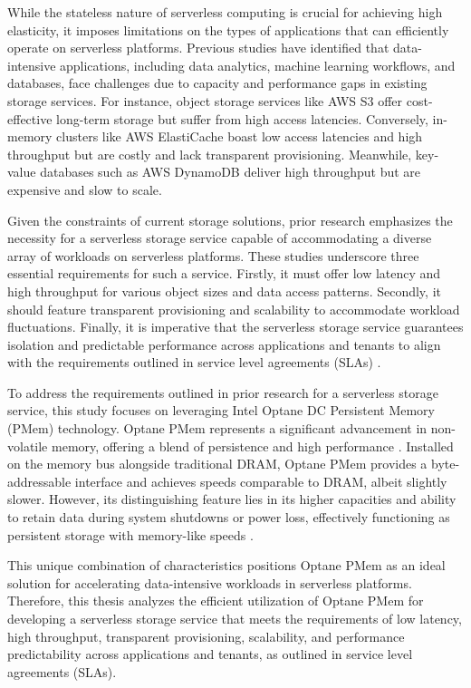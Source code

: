 While the stateless nature of serverless computing is crucial for achieving high elasticity, it imposes limitations on the types of applications that can efficiently operate on serverless platforms. Previous studies \cite{jonas2019cloud,pu2019shuffling,gan2019opensource} have identified that data-intensive applications, including data analytics, machine learning workflows, and databases, face challenges due to capacity and performance gaps in existing storage services. For instance, object storage services like AWS S3 offer cost-effective long-term storage but suffer from high access latencies. Conversely, in-memory clusters like AWS ElastiCache boast low access latencies and high throughput but are costly and lack transparent provisioning. Meanwhile, key-value databases such as AWS DynamoDB deliver high throughput but are expensive and slow to scale.

Given the constraints of current storage solutions, prior research emphasizes the necessity for a serverless storage service capable of accommodating a diverse array of workloads on serverless platforms. These studies underscore three essential requirements for such a service. Firstly, it must offer low latency and high throughput for various object sizes and data access patterns. Secondly, it should feature transparent provisioning and scalability to accommodate workload fluctuations. Finally, it is imperative that the serverless storage service guarantees isolation and predictable performance across applications and tenants to align with the requirements outlined in service level agreements (SLAs) \cite{jonas2019cloud,klimovic2018pocket}.

To address the requirements outlined in prior research for a serverless storage service, this study focuses on leveraging Intel Optane DC Persistent Memory (PMem) technology. Optane PMem represents a significant advancement in non-volatile memory, offering a blend of persistence and high performance \cite{IntelOp15:online}. Installed on the memory bus alongside traditional DRAM, Optane PMem provides a byte-addressable interface and achieves speeds comparable to DRAM, albeit slightly slower. However, its distinguishing feature lies in its higher capacities and ability to retain data during system shutdowns or power loss, effectively functioning as persistent storage with memory-like speeds \cite{yang2020empirical,izraelevitz2019basic}.

This unique combination of characteristics positions Optane PMem as an ideal solution for accelerating data-intensive workloads in serverless platforms. Therefore, this thesis analyzes the efficient utilization of Optane PMem for developing a serverless storage service that meets the requirements of low latency, high throughput, transparent provisioning, scalability, and performance predictability across applications and tenants, as outlined in service level agreements (SLAs).

